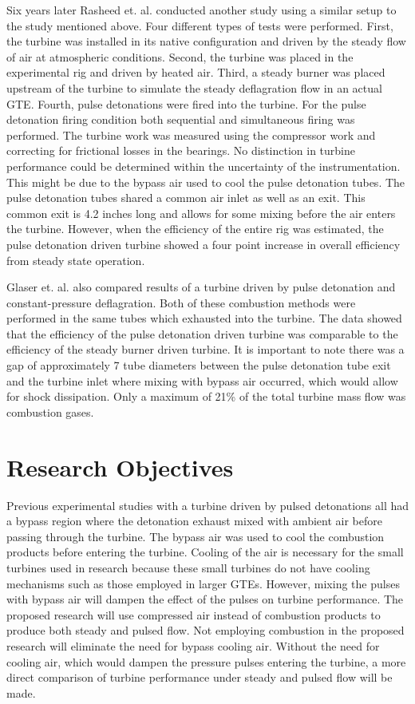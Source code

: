 \documentclass[12pt, letterpaper]{article}
\begin{document}
Six years later Rasheed et. al. \cite{Rasheed2011:Experimental} conducted another study using a similar setup to the study mentioned above. Four different types of tests were performed. First, the turbine was installed in its native configuration and driven by the steady flow of air at atmospheric conditions. Second, the turbine was placed in the experimental rig and driven by heated air. Third, a steady burner was placed upstream of the turbine to simulate the steady deflagration flow in an actual GTE. Fourth, pulse detonations were fired into the turbine. For the pulse detonation firing condition both sequential and simultaneous firing was performed. The turbine work was measured using the compressor work and correcting for frictional losses in the bearings. No distinction in turbine performance could be determined within the uncertainty of the instrumentation. This might be due to the bypass air used to cool the pulse detonation tubes. The pulse detonation tubes shared a common air inlet as well as an exit. This common exit is 4.2 inches long and allows for some mixing before the air enters the turbine. However, when the efficiency of the entire rig was estimated, the pulse detonation driven turbine showed a four point increase in overall efficiency from steady state operation.

Glaser et. al. \cite{Glaser2007:Performance} also compared results of a turbine driven by pulse detonation and constant-pressure deflagration. Both of these combustion methods were performed in the same tubes which exhausted into the turbine. The data showed that the efficiency of the pulse detonation driven turbine was comparable to the efficiency of the steady burner driven turbine. It is important to note there was a gap of approximately 7 tube diameters between the pulse detonation tube exit and the turbine inlet where mixing with bypass air occurred, which would allow for shock dissipation. Only a maximum of 21\% of the total turbine mass flow was combustion gases.

\section{Research Objectives}

Previous experimental studies with a turbine driven by pulsed detonations all had a bypass region where the detonation exhaust mixed with ambient air before passing through the turbine. The bypass air was used to cool the combustion products before entering the turbine. Cooling of the air is necessary for the small turbines used in research because these small turbines do not have cooling mechanisms such as those employed in larger GTEs. However, mixing the pulses with bypass air will dampen the effect of the pulses on turbine performance. The proposed research will use compressed air instead of combustion products to produce both steady and pulsed flow. Not employing combustion in the proposed research will eliminate the need for bypass cooling air. Without the need for cooling air, which would dampen the pressure pulses entering the turbine, a more direct comparison of turbine performance under steady and pulsed flow will be made.
\end{document}
